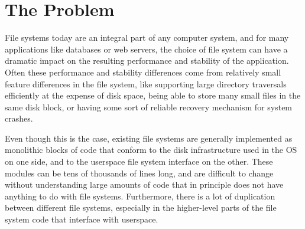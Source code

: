 \section{The Problem}
\label{sec:problem}

File systems today are an integral part of any computer system, and for many
applications like databases or web servers, the choice of file system can have a
dramatic impact on the resulting performance and stability of the application.
Often these performance and stability differences come from relatively small
feature differences in the file system, like supporting large directory
traversals efficiently at the expense of disk space, being able to store many
small files in the same disk block, or having some sort of reliable recovery
mechanism for system crashes.

Even though this is the case, existing file systems are generally implemented as
monolithic blocks of code that conform to the disk infrastructure used in the OS
on one side, and to the userspace file system interface on the other. These
modules can be tens of thousands of lines long, and are difficult to change
without understanding large amounts of code that in principle does not have
anything to do with file systems. Furthermore, there is a lot of duplication
between different file systems, especially in the higher-level parts of the file
system code that interface with userspace.
